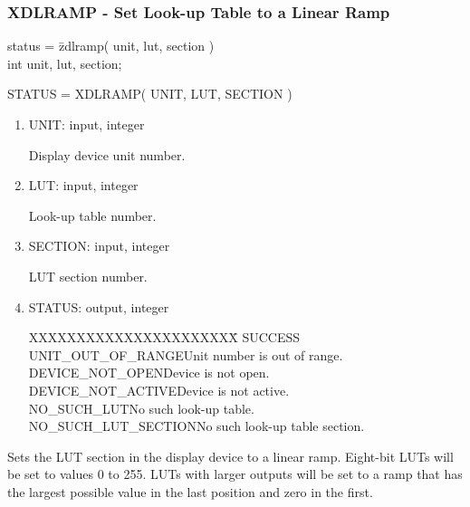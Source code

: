 \subsubsection{XDLRAMP - Set Look-up Table to a Linear Ramp}
\begin{tabbing}
status = \=zdlramp( unit, lut, section )\\
\>int  unit, lut, section;\\
\end{tabbing}
STATUS = XDLRAMP( UNIT, LUT, SECTION )
\begin{enumerate}
\item UNIT:  input, integer

Display device unit number.
\item LUT:  input, integer

Look-up table number.
\item SECTION:  input, integer

LUT section number.
\item STATUS:  output, integer
\begin{tabbing}
XXXXXXXXXXXXXXXXXXXXXX\=\kill
SUCCESS\\
UNIT\_OUT\_OF\_RANGE\>Unit number is out of range.\\
DEVICE\_NOT\_OPEN\>Device is not open.\\
DEVICE\_NOT\_ACTIVE\>Device is not active.\\
NO\_SUCH\_LUT\>No such look-up table.\\
NO\_SUCH\_LUT\_SECTION\>No such look-up table section.\\
\end{tabbing}
\end{enumerate}
Sets the LUT section in the display device to a linear ramp.  Eight-bit
LUTs will be set to values 0 to 255.  LUTs with larger outputs
will be set to a ramp that has the largest possible value in the last
position and zero in the first.
\newpage
